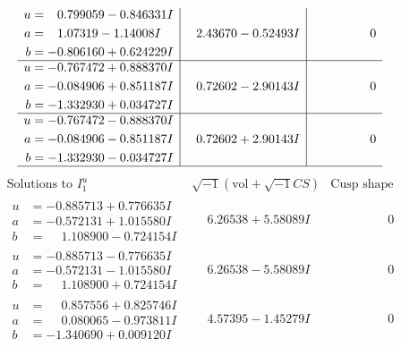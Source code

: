 \documentclass[1p]{elsarticle_modified}
\theoremstyle{definition}
\newcommand{\I}{\sqrt{-1}}
\begin{document}
$$\begin{array}{c|c|c}
\begin{aligned}
u &= \phantom{-}0.799059 - 0.846331 I \\
a &= \phantom{-}1.07319 - 1.14008 I \\
b &= -0.806160 + 0.624229 I\end{aligned}
 & \phantom{-}2.43670 - 0.52493 I & \phantom{-0.000000 } 0 \\ \hline\begin{aligned}
u &= -0.767472 + 0.888370 I \\
a &= -0.084906 + 0.851187 I \\
b &= -1.332930 + 0.034727 I\end{aligned}
 & \phantom{-}0.72602 - 2.90143 I & \phantom{-0.000000 } 0 \\ \hline\begin{aligned}
u &= -0.767472 - 0.888370 I \\
a &= -0.084906 - 0.851187 I \\
b &= -1.332930 - 0.034727 I\end{aligned}
 & \phantom{-}0.72602 + 2.90143 I & \phantom{-0.000000 } 0\\
 \hline 
 \end{array}$$\newpage$$\begin{array}{c|c|c}  
\text{Solutions to }I^u_{1}& \I (\text{vol} + \sqrt{-1}CS) & \text{Cusp shape}\\
 \hline 
\begin{aligned}
u &= -0.885713 + 0.776635 I \\
a &= -0.572131 + 1.015580 I \\
b &= \phantom{-}1.108900 - 0.724154 I\end{aligned}
 & \phantom{-}6.26538 + 5.58089 I & \phantom{-0.000000 } 0 \\ \hline\begin{aligned}
u &= -0.885713 - 0.776635 I \\
a &= -0.572131 - 1.015580 I \\
b &= \phantom{-}1.108900 + 0.724154 I\end{aligned}
 & \phantom{-}6.26538 - 5.58089 I & \phantom{-0.000000 } 0 \\ \hline\begin{aligned}
u &= \phantom{-}0.857556 + 0.825746 I \\
a &= \phantom{-}0.080065 - 0.973811 I \\
b &= -1.340690 + 0.009120 I\end{aligned}
 & \phantom{-}4.57395 - 1.45279 I & \phantom{-0.000000 } 0 \\ \hline\begin{aligned}

\end{aligned}
\end{array}$$
\end{document}
